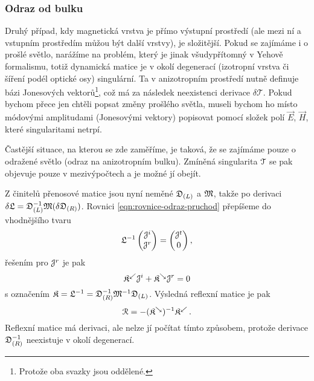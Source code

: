\subsubsection*{Odraz od bulku}

Druhý případ, kdy magnetická vrstva je přímo výstupní prostředí (ale mezi ní a vstupním prostředím můžou být další vrstvy), je složitější.
Pokud se zajímáme i o prošlé světlo, narážíme na problém, který je jinak všudypřítomný v Yehově formalismu, totiž dynamická matice je v okolí degenerací (izotropní vrstva či šíření podél optické osy) singulární.
Ta v anizotropním prostředí nutně definuje bázi Jonesových vektorů\footnote{Protože oba svazky jsou oddělené.}, což má za následek neexistenci derivace $\delta\mathcal{T}$.
Pokud bychom přece jen chtěli popsat změny prošlého světla, museli bychom ho místo módovými amplitudami (Jonesovými vektory) popisovat pomocí složek polí $\vec{E}$, $\vec{H}$, které singularitami netrpí.

Častější situace, na kterou se zde zaměříme, je taková, že se zajímáme pouze o odražené světlo (odraz na anizotropním bulku).
Zmíněná singularita $\mathcal{T}$ se pak objevuje pouze v mezivýpočtech a je možné jí obejít.

Z činitelů přenosové matice jsou nyní neměné $\mathfrak{D}_{(L)}$ a $\mathfrak{M}$, takže po derivaci $\delta\mathfrak{L}=\mathfrak{D}_{(L)}^{-1}\mathfrak{M}(\delta\mathfrak{D}_{(R)})$.
Rovnici \eqref{eqn:rovnice-odraz-pruchod} přepíšeme do vhodnějšího tvaru
\begin{equation}
    \mathfrak{L}^{-1} \begin{pmatrix} \mathcal{J}^i \\ \mathcal{J}^r \end{pmatrix}
    = \begin{pmatrix} \mathcal{J}^t \\ 0 \end{pmatrix} ,
\end{equation}
řešením pro $\mathcal{J}^r$ je pak
\begin{equation}
    \label{eqn:app-projekce}
    \mathfrak{K}^\swarrow \mathcal{J}^i + \mathfrak{K}^\searrow \mathcal{J}^r = 0
\end{equation}
s označením $\mathfrak{K}=\mathfrak{L}^{-1} = \mathfrak{D}_{(R)}^{-1}\mathfrak{M}^{-1}\mathfrak{D}_{(L)}$.
Výsledná reflexní matice je pak 
\begin{equation}
    \label{eqn:app-refl-bulk}
\mathcal{R}=-(\mathfrak{K}^\searrow)^{-1}\mathfrak{K}^\swarrow \,.
\end{equation}
Reflexní matice má derivaci, ale nelze jí počítat tímto způsobem, protože derivace $\mathfrak{D}_{(R)}^{-1}$ neexistuje v okolí degenerací.

